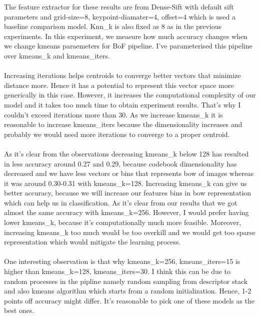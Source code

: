 \documentclass[12pt]{article}
\begin{document}
        \begin{center}
            \raggedright
            The feature extractor for these results are from Dense-Sift with default sift parameters and grid-size=8, keypoint-diamater=4, offset=4 which is used a baseline comparison model. Knn\_k is also fixed as 8 as in the previous experiments.
            In this experiment, we measure how much accuracy changes when we change kmeans paraemeters
            for BoF pipeline. I've parameterised this pipeline over kmeans\_k and kmeans\_iters.
            \\~\\
            Increasing iterations helps centroids to converge better vectors that minimize distance more.
            Hence it has a potential to represent this vector space more generically in this case.
            However, it increases the computational complexity of our model and it takes too much time to obtain experiment results. 
            That's why I couldn't exceed iterations more than 30.
            As we increase kmeans\_k it is reasonable to increase kmeans\_iters because the dimensionality increases and probably we would need more
            iterations to converge to a proper centroid.
            \\~\\
            As it's clear from the observations decreasing kmeans\_k below 128 has resulted in less accuracy around 0.27 and 0.29, because codebook dimensionality has decreased
            and we have less vectors or bins that represents bow of images whereas
            it was around 0.30-0.31 with kmeans\_k=128. Increasing kmeans\_k can give us better accuracy, because
            we will increase our features bins in bow representation which can help us in classification.
            As it's clear from our results that we got almost the same accuracy with kmeans\_k=256.
            However, I would prefer having lower kmeans\_k, because it's computationally much more feasible.
            Moreover, increasing kmeans\_k too much would be too overkill and
            we would get too sparse representation which would mitigate the learning process.
            \\~\\
            One interesting observation is that why kmeans\_k=256, kmeans\_iters=15 is higher than kmeans\_k=128, kmeans\_iters=30.
            I think this can be due to random processes in the pipline namely random sampling from descriptor stack and also kmeans algorithm which
            starts from a random initialization. Hence, 1-2 points off accuracy might differ. It's reasonable to pick one of these models as the best ones.

        \end{center}
\end{document}
